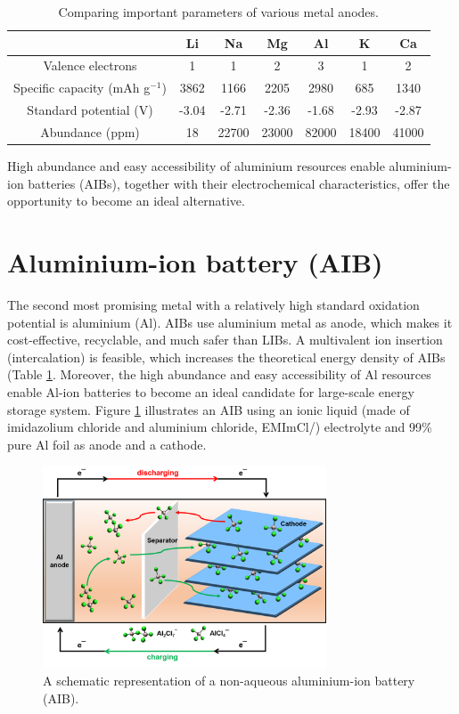 \begin{table}[tbh!]
\caption{Comparing important parameters of various metal anodes.} \label{table2}
\begin{tabular}{|ccccccc|}
\hline
\hline
 & \textbf{Li} & \textbf{Na} & \textbf{Mg} & \textbf{Al} & \textbf{K} & \textbf{Ca}\\
\hline
Valence electrons & 1 & 1 & 2 & 3 & 1 & 2\\
Specific capacity (mAh g$^{-1}$) & 3862 & 1166 & 2205 & 2980 & 685 & 1340\\
Standard potential (V) & -3.04 & -2.71 & -2.36  & -1.68 & -2.93 & -2.87\\
Abundance (ppm) & 18 & 22700 & 23000 & 82000 & 18400 & 41000\\
\hline  %
\end{tabular}
\end{table}

High abundance and easy accessibility of aluminium resources enable aluminium-ion batteries (AIBs), together with their electrochemical characteristics, offer the opportunity to become an ideal alternative.

\section{Aluminium-ion battery (AIB)}
The second most promising metal with a relatively high standard oxidation potential is aluminium (Al). AIBs use aluminium metal as anode, which makes it cost-effective, recyclable, and much safer than LIBs. A multivalent ion insertion (intercalation) is feasible, which increases the theoretical energy density of AIBs (Table \ref{table2}. Moreover, the high abundance and easy accessibility of Al resources enable Al-ion batteries to become an ideal candidate for large-scale energy storage system. 
Figure \ref{Figures/chap1fig:AIBmech} illustrates an AIB using an ionic liquid  (made of imidazolium chloride and aluminium chloride, EMImCl/) electrolyte and 99\% pure Al foil as anode and a cathode.

\begin{figure}[tbh!]
\centering
\includegraphics[width=0.75\textwidth]{Figures/chap1fig/AIBmech}
\caption{A schematic representation of a non-aqueous aluminium-ion battery (AIB).}
\label{Figures/chap1fig:AIBmech}
\end{figure}

